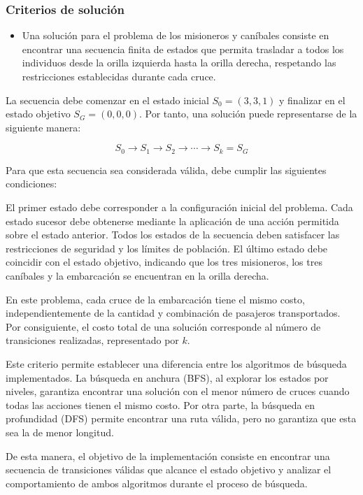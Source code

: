 \documentclass[
  spanish,
]{llncs}
\providecommand{\tightlist}{%
  \setlength{\itemsep}{0pt}\setlength{\parskip}{0pt}}
\begin{document}
\subsubsection{Criterios de solución}\label{criterios-de-soluciuxf3n}

\begin{itemize}
\tightlist
\item
  Una solución para el problema de los misioneros y caníbales consiste
  en encontrar una secuencia finita de estados que permita trasladar a
  todos los individuos desde la orilla izquierda hasta la orilla
  derecha, respetando las restricciones establecidas durante cada cruce.
\end{itemize}

La secuencia debe comenzar en el estado inicial \(S_0=(3,3,1)\) y
finalizar en el estado objetivo \(S_G=(0,0,0)\). Por tanto, una solución
puede representarse de la siguiente manera:

\[
S_0\rightarrow S_1\rightarrow S_2\rightarrow\cdots\rightarrow S_k=S_G
\]

Para que esta secuencia sea considerada válida, debe cumplir las
siguientes condiciones:

El primer estado debe corresponder a la configuración inicial del
problema. Cada estado sucesor debe obtenerse mediante la aplicación de
una acción permitida sobre el estado anterior. Todos los estados de la
secuencia deben satisfacer las restricciones de seguridad y los límites
de población. El último estado debe coincidir con el estado objetivo,
indicando que los tres misioneros, los tres caníbales y la embarcación
se encuentran en la orilla derecha.

En este problema, cada cruce de la embarcación tiene el mismo costo,
independientemente de la cantidad y combinación de pasajeros
transportados. Por consiguiente, el costo total de una solución
corresponde al número de transiciones realizadas, representado por
\(k\).

Este criterio permite establecer una diferencia entre los algoritmos de
búsqueda implementados. La búsqueda en anchura (BFS), al explorar los
estados por niveles, garantiza encontrar una solución con el menor
número de cruces cuando todas las acciones tienen el mismo costo. Por
otra parte, la búsqueda en profundidad (DFS) permite encontrar una ruta
válida, pero no garantiza que esta sea la de menor longitud.

De esta manera, el objetivo de la implementación consiste en encontrar
una secuencia de transiciones válidas que alcance el estado objetivo y
analizar el comportamiento de ambos algoritmos durante el proceso de
búsqueda.
\end{document}
